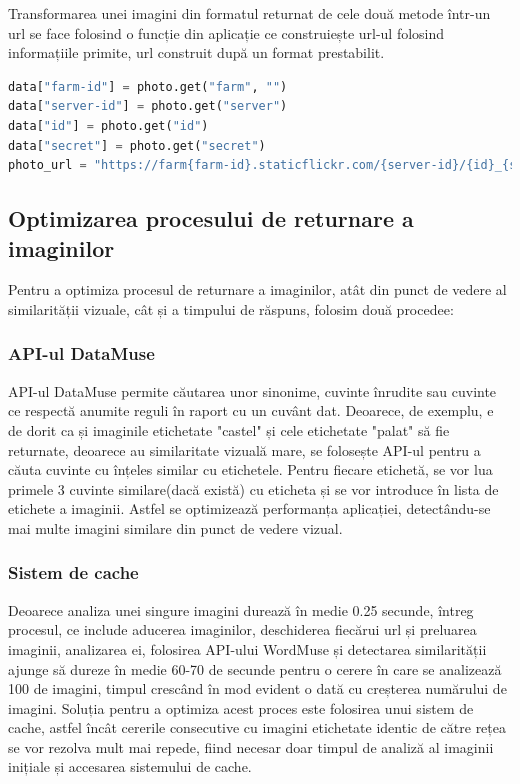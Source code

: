 Transformarea unei imagini din formatul returnat de cele două metode într-un url se face folosind o funcție din aplicație ce construiește url-ul folosind informațiile primite, url construit după un format prestabilit.
\begin{lstlisting}[language=Python]
data["farm-id"] = photo.get("farm", "")
data["server-id"] = photo.get("server")
data["id"] = photo.get("id")
data["secret"] = photo.get("secret")
photo_url = "https://farm{farm-id}.staticflickr.com/{server-id}/{id}_{secret}.jpg".format(**data)
\end{lstlisting}

\subsection{Optimizarea procesului de returnare a imaginilor}
Pentru a optimiza procesul de returnare a imaginilor, atât din punct de vedere al similarității vizuale, cât și a timpului de răspuns, folosim două procedee:
\subsubsection{API-ul DataMuse}
API-ul DataMuse permite căutarea unor sinonime, cuvinte înrudite sau cuvinte ce respectă anumite reguli în raport cu un cuvânt dat. Deoarece, de exemplu, e de dorit ca și imaginile etichetate "castel" și cele etichetate "palat" să fie returnate, deoarece au similaritate vizuală mare, se folosește API-ul pentru a căuta cuvinte cu înțeles similar cu etichetele. Pentru fiecare etichetă, se vor lua primele 3 cuvinte similare(dacă există) cu eticheta și se vor introduce în lista de etichete a imaginii. Astfel se optimizează performanța aplicației, detectându-se mai multe imagini similare din punct de vedere vizual.
\subsubsection{Sistem de cache}
Deoarece analiza unei singure imagini durează în medie 0.25 secunde, întreg procesul, ce include aducerea imaginilor, deschiderea fiecărui url și preluarea imaginii, analizarea ei, folosirea API-ului WordMuse și detectarea similarității ajunge să dureze în medie 60-70 de secunde pentru o cerere în care se analizează 100 de imagini, timpul crescând în mod evident o dată cu creșterea numărului de imagini. Soluția pentru a optimiza acest proces este folosirea unui sistem de cache, astfel încât cererile consecutive cu imagini etichetate identic de către rețea se vor rezolva mult mai repede, fiind necesar doar timpul de analiză al imaginii inițiale și accesarea sistemului de cache.